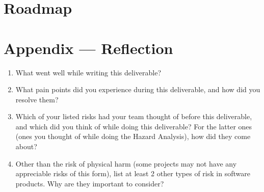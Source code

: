 \documentclass{article}
\begin{document}

\section{Roadmap}


\newpage{}

\section*{Appendix --- Reflection}




\begin{enumerate}
    \item What went well while writing this deliverable? 
    \item What pain points did you experience during this deliverable, and how
    did you resolve them?
    \item Which of your listed risks had your team thought of before this
    deliverable, and which did you think of while doing this deliverable? For
    the latter ones (ones you thought of while doing the Hazard Analysis), how
    did they come about?
    \item Other than the risk of physical harm (some projects may not have any
    appreciable risks of this form), list at least 2 other types of risk in
    software products. Why are they important to consider?
\end{enumerate}
\end{document}
